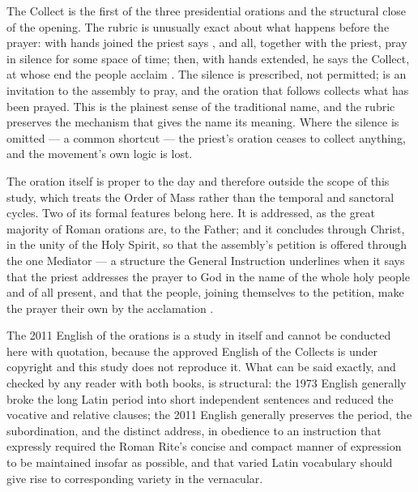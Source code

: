 The Collect is the first of the three presidential orations and the structural close of the
opening. The rubric is unusually exact about what happens before the prayer: with hands joined
the priest says , and all, together with the priest, pray in silence for some
space of time; then, with hands extended, he says the Collect, at whose end the people acclaim
. The silence is prescribed, not permitted;  is an
invitation to the assembly to pray, and the oration that follows collects what has been prayed.
This is the plainest sense of the traditional name, and the rubric preserves the mechanism that
gives the name its meaning. Where the silence is omitted --- a common shortcut --- the priest's
oration ceases to collect anything, and the movement's own logic is lost.

The oration itself is proper to the day and therefore outside the scope of this study, which
treats the Order of Mass rather than the temporal and sanctoral cycles. Two of its formal
features belong here. It is addressed, as the great majority of Roman orations are, to the
Father; and it concludes through Christ, in the unity of the Holy Spirit, so that the
assembly's petition is offered through the one Mediator --- a structure the General Instruction
underlines when it says that the priest addresses the prayer to God in the name of the whole
holy people and of all present, and that the people, joining themselves to the petition, make
the prayer their own by the acclamation .

The 2011 English of the orations is a study in itself and cannot be conducted here with
quotation, because the approved English of the Collects is under copyright and this study does
not reproduce it. What can be said exactly, and checked by any reader with both books, is
structural: the 1973 English generally broke the long Latin period into short independent
sentences and reduced the vocative and relative clauses; the 2011 English generally preserves
the period, the subordination, and the distinct address, in obedience to an instruction that
expressly required the Roman Rite's concise and compact manner of expression to be maintained
insofar as possible, and that varied Latin vocabulary should give rise to corresponding variety
in the vernacular.
